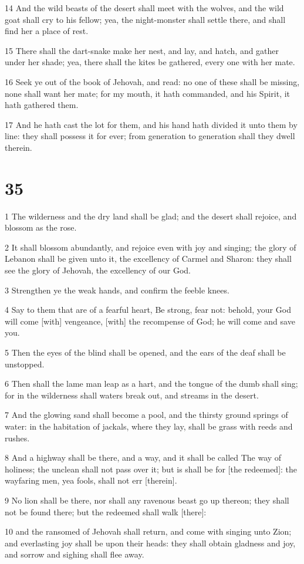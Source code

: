 \par 14 And the wild beasts of the desert shall meet with the wolves, and the wild goat shall cry to his fellow; yea, the night-monster shall settle there, and shall find her a place of rest.
\par 15 There shall the dart-snake make her nest, and lay, and hatch, and gather under her shade; yea, there shall the kites be gathered, every one with her mate.
\par 16 Seek ye out of the book of Jehovah, and read: no one of these shall be missing, none shall want her mate; for my mouth, it hath commanded, and his Spirit, it hath gathered them.
\par 17 And he hath cast the lot for them, and his hand hath divided it unto them by line: they shall possess it for ever; from generation to generation shall they dwell therein.

\chapter{35}

\par 1 The wilderness and the dry land shall be glad; and the desert shall rejoice, and blossom as the rose.
\par 2 It shall blossom abundantly, and rejoice even with joy and singing; the glory of Lebanon shall be given unto it, the excellency of Carmel and Sharon: they shall see the glory of Jehovah, the excellency of our God.
\par 3 Strengthen ye the weak hands, and confirm the feeble knees.
\par 4 Say to them that are of a fearful heart, Be strong, fear not: behold, your God will come [with] vengeance, [with] the recompense of God; he will come and save you.
\par 5 Then the eyes of the blind shall be opened, and the ears of the deaf shall be unstopped.
\par 6 Then shall the lame man leap as a hart, and the tongue of the dumb shall sing; for in the wilderness shall waters break out, and streams in the desert.
\par 7 And the glowing sand shall become a pool, and the thirsty ground springs of water: in the habitation of jackals, where they lay, shall be grass with reeds and rushes.
\par 8 And a highway shall be there, and a way, and it shall be called The way of holiness; the unclean shall not pass over it; but is shall be for [the redeemed]: the wayfaring men, yea fools, shall not err [therein].
\par 9 No lion shall be there, nor shall any ravenous beast go up thereon; they shall not be found there; but the redeemed shall walk [there]:
\par 10 and the ransomed of Jehovah shall return, and come with singing unto Zion; and everlasting joy shall be upon their heads: they shall obtain gladness and joy, and sorrow and sighing shall flee away.

